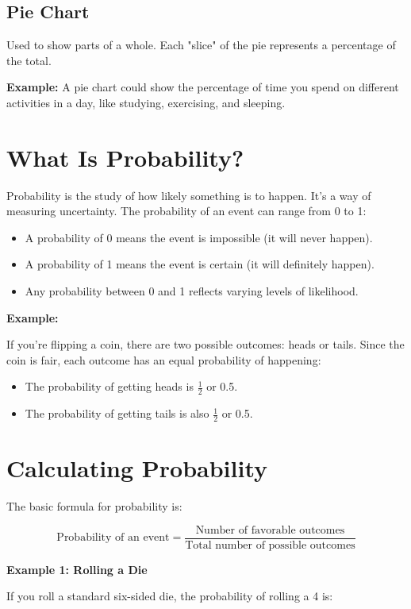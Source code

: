 \subsection{Pie Chart}
Used to show parts of a whole. Each "slice" of the pie represents a percentage of the total.

\textbf{Example:} A pie chart could show the percentage of time you spend on different activities in a day, like studying, exercising, and sleeping.

\section{What Is Probability?}
Probability is the study of how likely something is to happen. It’s a way of measuring uncertainty. The probability of an event can range from 0 to 1:

\begin{itemize}
    \item A probability of 0 means the event is impossible (it will never happen).
    \item A probability of 1 means the event is certain (it will definitely happen).
    \item Any probability between 0 and 1 reflects varying levels of likelihood.
\end{itemize}

\textbf{Example:}

If you're flipping a coin, there are two possible outcomes: heads or tails. Since the coin is fair, each outcome has an equal probability of happening:

\begin{itemize}
    \item The probability of getting heads is $\frac{1}{2}$ or 0.5.
    \item The probability of getting tails is also $\frac{1}{2}$ or 0.5.
\end{itemize}

\section{Calculating Probability}
The basic formula for probability is:

\[
\text{Probability of an event} = \frac{\text{Number of favorable outcomes}}{\text{Total number of possible outcomes}}
\]

\textbf{Example 1: Rolling a Die}

If you roll a standard six-sided die, the probability of rolling a 4 is:


